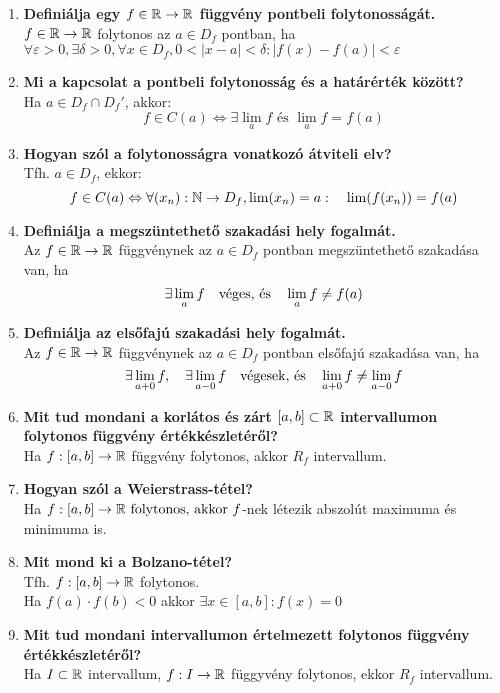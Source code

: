 \documentclass[a4paper,11pt]{article}
\begin{document}
\begin{enumerate}
	\item \textbf{Definiálja egy $f\in\displaystyle\mathbb{R}\to\mathbb{R}$ függvény pontbeli folytonosságát.}\\[0.2cm] $f\in\mathbb{R}\to\mathbb{R}$ folytonos az $a\in D_f$ pontban, ha\\[0.2cm] $\forall\varepsilon>0,\exists\delta>0,\forall x\in D_f,0<|x-a|<\delta : |f(x)-f(a)|<\varepsilon$
	\item \textbf{Mi a kapcsolat a pontbeli folytonosság és a határérték között?}\\[0.2cm]Ha $a\in D_f\cap D_f'$, akkor: \[ f\in C(a)\Leftrightarrow \exists\lim_a f \text{ és } \lim_a f=f(a)\]
	\item \textbf{Hogyan szól a folytonosságra vonatkozó átviteli elv?}\\[0.2cm] Tfh. $a\in D_f$, ekkor: \[f\in C(a)\Leftrightarrow\forall(x_n):\mathbb{N}\to D_f, \lim(x_n)=a:\quad\lim(f(x_n))=f(a)\]
	\item \textbf{Definiálja a megszüntethető szakadási hely fogalmát.}\\[0.1cm]
	Az $f\in\mathbb{R}\to\mathbb{R}$ függvénynek az $a\in D_f$ pontban megszüntethető szakadása van, ha \[ \exists\lim_{a} f\text{\quad véges, és\quad } \lim_a f\not=f(a)\]
	\item \textbf{Definiálja az elsőfajú szakadási hely fogalmát.}\\[0.1cm]
	Az $f\in\mathbb{R}\to\mathbb{R}$ függvénynek az $a\in D_f$ pontban elsőfajú szakadása van, ha \[ \exists \lim_{a+0} f,\quad \exists\lim_{a-0}f \text{\quad végesek, és\quad } \lim_{a+0} f \not= \lim_{a-0}f \]
	\item \textbf{Mit tud mondani a korlátos és zárt $[a,b]\subset\mathbb{R}$ intervallumon folytonos függvény értékkészletéről?}\\[0.1cm]Ha $f:[a,b]\to\mathbb{R}$ függvény folytonos, akkor $R_f$ intervallum.
	\item \textbf{Hogyan szól a Weierstrass-tétel?}\\[0.1cm]
	Ha $ f:[a,b]\to\mathbb{R}\text{ folytonos, akkor } f$-nek létezik abszolút maximuma és minimuma is.
	\item \textbf{Mit mond ki a Bolzano-tétel?}\\[0.1cm]
	Tfh. $f: [a,b] \to \mathbb{R}$ folytonos.\\[0.1cm]Ha $f(a)\cdot f(b) < 0$ akkor $\exists x \in [a,b]: f(x) = 0$
	\item \textbf{Mit tud mondani intervallumon értelmezett folytonos függvény értékkészletéről?}\\[0.1cm]Ha $I\subset\mathbb{R}$ intervallum, $f: I \to\mathbb{R}$ függyvény folytonos, ekkor $R_f$ intervallum.

\end{enumerate}
\end{document}
